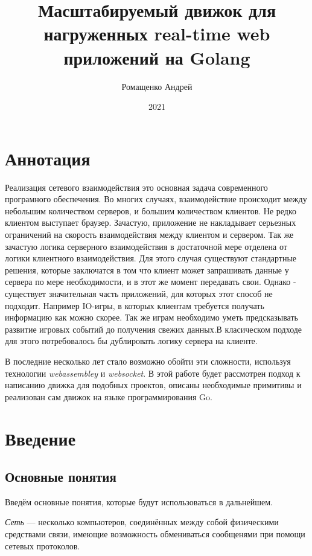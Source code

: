 \documentclass[a4paper,14pt, openany]{book}
\title{Масштабируемый движок для нагруженных real-time web приложений на Golang}
\author{Ромащенко Андрей}
\date{2021}
\begin{document}
\maketitle

\chapter*{Аннотация}

Реализация сетевого взаимодействия это основная задача современного програмного обеспечения. Во многих случаях, взаимодействие происходит между небольшим количеством серверов, и большим количеством клиентов. Не редко клиентом выступает браузер. Зачастую, приложение не накладывает серьезных ограничений на скорость взаимодействия между клиентом и сервером. Так же зачастую логика серверного взаимодействия в достаточной мере отделена от логики клиентного взаимодействия. Для этого случая существуют стандартные решения, которые заключатся в том что клиент может запрашивать данные у сервера по мере необходимости, и в этот же момент передавать свои. Однако - существует значительная часть приложений, для которых этот способ не подходит. Например IO-игры, в которых клиентам требуется получать информацию как можно скорее. Так же играм необходимо уметь предсказывать развитие игровых событий до получения свежих данных.В класическом подходе для этого потребовалось бы дублировать логику сервера на клиенте.

В последние несколько лет стало возможно обойти эти сложности, используя технологии \textit{webassembley}  и \textit{websocket}. В этой работе будет рассмотрен подход к написанию движка для подобных проектов, описаны необходимые примитивы и реализован сам движок на языке программирования Go.
\par
\setcounter{page}{1}
\tableofcontents
\clearpage



\chapter{Введение}

\section{Основные понятия}

Введём основные понятия, которые будут использоваться в дальнейшем.

\emph{Сеть} --- несколько компьютеров, соединённых между собой физическими средствами связи, имеющие возможность обмениваться сообщенями при помощи сетевых протоколов.
\end{document}
